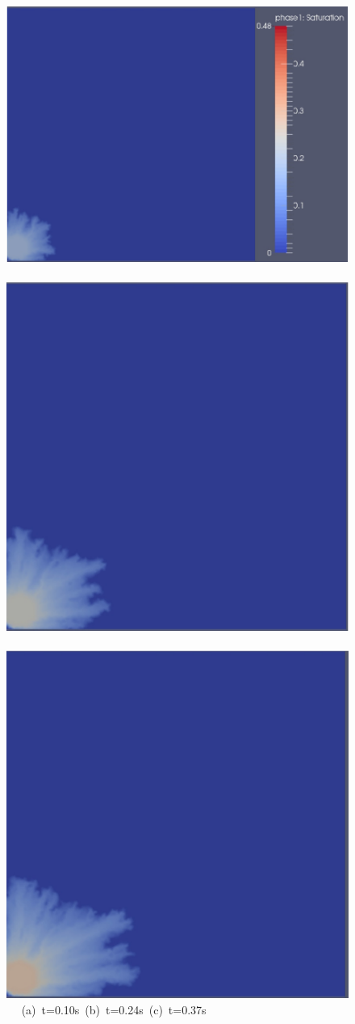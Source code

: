 \begin{landscape}
  \begin{figure}[ht]
  \vbox{\vspace{-.5cm}
      \hbox{\includegraphics[width=.65\textwidth, height=.46\textwidth]{./Pics1/Saffman_heterogeneous_VR150/ST_Heterog_VR150_D200Hb.pdf} 
            \includegraphics[width=.45\textwidth]{./Pics1/Saffman_heterogeneous_VR150/ST_Heterog_VR150_D500Hb.pdf}
            \includegraphics[width=.45\textwidth]{./Pics1/Saffman_heterogeneous_VR150/ST_Heterog_VR150_D800Hb.pdf} }
      \hbox{\hspace{2.0cm} (a) t=0.10s \hspace{6.cm} (b) t=0.24s \hspace{4.cm} (c) t=0.37s}
      \vspace{0.5cm}
}
\end{figure}
\end{landscape}
